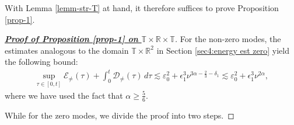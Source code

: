 \documentclass[11pt,reqno]{article}
\numberwithin{equation}{section}
\newcommand\R{{\mathbb R}}
\newcommand\T{{\mathbb T}}
\newcommand\D{{\mathcal D}}
\newcommand\E{{\mathcal E}}
\let\var=\varepsilon
\let\f=\frac
\let\ep=\epsilon
\begin{document}
With Lemma \ref{lemm-str-T} at hand, it therefore suffices to prove Proposition \ref{prop-1}.
\begin{proof}[\underline{\textbf{Proof of Proposition \ref{prop-1} on $\T\times\R\times \T$}}]
    For the non-zero modes, the estimates analogous to the domain $\T\times\R^2$ in Section \ref{sec4:energy est zero} yield the following bound:
    \begin{align}\label{sec3:priori result-1-T}
	   \sup_{\tau\in[0,t]}\E_{\not=}(\tau)
	   +\int_0^t\D_{\not=}(\tau)\,d\tau
	   \lesssim \var_0^2+\ep_1^3\nu^{3\alpha-\f23-\delta_1}
       \lesssim \var_0^2+\ep_1^3\nu^{2\alpha},
    \end{align}
    where we have used the fact that $\alpha\geq \f56$.
    
    \noindent While for the zero modes, we divide the proof into two steps.

    \medskip


\end{proof}
\end{document}
